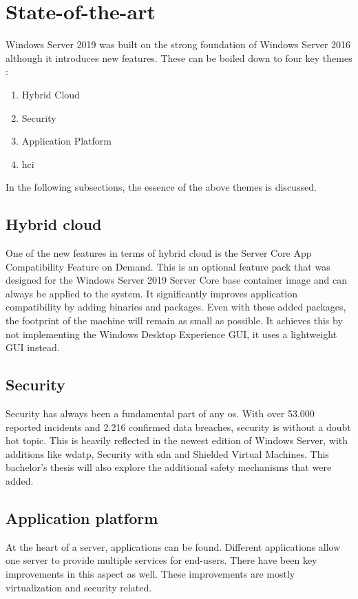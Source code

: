 \section{State-of-the-art}\label{sec:state-of-the-art}
Windows Server 2019 was built on the strong foundation of Windows Server 2016 although it introduces new features. \autocite{Gerend2018}
These can be boiled down to four key themes \autocite{MWST2018}:
\begin{enumerate}
	\item Hybrid Cloud
	\item Security
	\item Application Platform
	\item  \acrfull{hci}
\end{enumerate}
In the following subsections, the essence of the above themes is discussed.
\subsection{Hybrid cloud}
One of the new features in terms of hybrid cloud is the Server Core App Compatibility Feature on Demand. \autocite{Pacquer2018}
This is an optional feature pack that was designed for the Windows Server 2019 Server Core base container image and can always be applied to the system. 
It significantly improves application compatibility by adding binaries and packages. 
Even with these added packages, the footprint of the machine will remain as small as possible. 
It achieves this by not implementing the Windows Desktop Experience GUI, it uses a lightweight GUI instead.
\subsection{Security}
Security has always been a fundamental part of any \acrshort{os}. 
With over 53.000 reported incidents and 2.216 confirmed data breaches, security is without a doubt hot topic. \autocite{Verizon2018} 
This is heavily reflected in the newest edition of Windows Server, with additions like \acrfull{wdatp}, Security with \acrfull{sdn} and Shielded Virtual Machines. 
This bachelor's thesis will also explore the additional safety mechanisms that were added.
\subsection{Application platform}
At the heart of a server, applications can be found. 
Different applications allow one server to provide multiple services for end-users. 
There have been key improvements in this aspect as well. 
These improvements are mostly virtualization and security related. 
